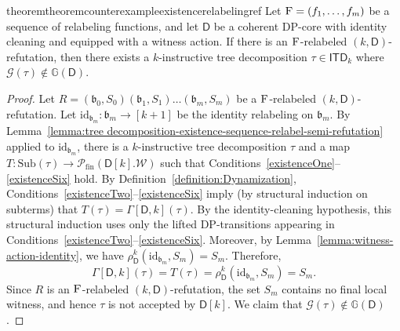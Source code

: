 \documentclass[11pt,a4paper]{article}
\newcommand{\treewidthvalue}{k}
\newcommand{\decompositiongraph}[1]{\mathcal{G}(#1)}
\newcommand{\abag}{\mathfrak{b}}
\newcommand{\allsubterms}{\mathrm{Sub}}
\newcommand{\allabstractdecompositionstreewidth}[1]{\mathsf{ITD}_{#1}}
\newcommand{\abstractdecomposition}{\tau}
\newcommand{\allwitnesses}{\mathcal{W}}
\newcommand{\finitepowerset}[1]{\mathcal{P}_{\mathrm{fin}}(#1)}
\newcommand{\dpcoregraphproperty}[1]{\mathbb{G}(#1)}
\newcommand{\dpcore}{\mathsf{D}}
\newcommand{\witnessset}{S}
\newcommand{\dynamizationfunctionname}[1]{\Gamma[{#1}]}
\newcommand{\dynamizationfunction}[2]{\dynamizationfunctionname{#1,#2}}
\newcommand{\dprefutation}{R}
\newcommand{\subtermToBag}{T}
\newcommand{\relabelingfunction}{f}
\newcommand{\action}{\rho}
\newcommand{\relabelsequence}{\textsc{F}}
\begin{document}
\begin{restatable}{theorem}{theoremcounterexampleexistencerelabelingref}\label{theorem:counterexample-existence-relabel-refutation}
Let $\relabelsequence=(\relabelingfunction_1,\dots,\relabelingfunction_m)$ be a sequence of relabeling functions, and let $\dpcore$ be a coherent DP-core with identity cleaning and equipped with a witness action. If there is an $\relabelsequence$-relabeled $(\treewidthvalue,\dpcore)$-refutation, then there exists a $\treewidthvalue$-instructive tree decomposition $\abstractdecomposition \in \allabstractdecompositionstreewidth{\treewidthvalue}$ where $\decompositiongraph{\abstractdecomposition}\notin \dpcoregraphproperty{\dpcore}$.
\end{restatable}
\begin{proof}
Let $\dprefutation= (\abag_0,\witnessset_0)(\abag_1,\witnessset_1)\dots (\abag_{m},\witnessset_m)$ be a $\relabelsequence$-relabeled $(\treewidthvalue,\dpcore)$-refutation.
Let $\mathrm{id}_{\abag_m}:\abag_m\to[\treewidthvalue+1]$ be the identity relabeling on $\abag_m$.
By Lemma~\ref{lemma:tree decomposition-existence-sequence-relabel-semi-refutation} applied to $\mathrm{id}_{\abag_m}$, there is a $\treewidthvalue$-instructive tree decomposition $\abstractdecomposition$ and a map
$\subtermToBag:\allsubterms(\abstractdecomposition) \to \finitepowerset{\dpcore[\treewidthvalue].\allwitnesses}$ such that Conditions~\ref{existenceOne}--\ref{existenceSix} hold. By Definition~\ref{definition:Dynamization}, Conditions~\ref{existenceTwo}--\ref{existenceSix} imply (by structural induction on subterms) that $\subtermToBag(\abstractdecomposition)=\dynamizationfunction{\dpcore}{\treewidthvalue}(\abstractdecomposition)$.
By the identity-cleaning hypothesis, this structural induction uses only the lifted DP-transitions appearing in Conditions~\ref{existenceTwo}--\ref{existenceSix}.
Moreover, by Lemma~\ref{lemma:witness-action-identity}, we have $\action_{\dpcore}^{\treewidthvalue}(\mathrm{id}_{\abag_m},\witnessset_m)=\witnessset_m$. Therefore,
\[
\dynamizationfunction{\dpcore}{\treewidthvalue}(\abstractdecomposition)
=\subtermToBag(\abstractdecomposition)
=\action_{\dpcore}^{\treewidthvalue}(\mathrm{id}_{\abag_m},\witnessset_m)
=\witnessset_m.
\]
	Since $\dprefutation$ is an $\relabelsequence$-relabeled $(\treewidthvalue,\dpcore)$-refutation, the set $\witnessset_m$ contains no final local witness, and hence $\abstractdecomposition$ is not accepted by $\dpcore[\treewidthvalue]$.
	We claim that $\decompositiongraph{\abstractdecomposition}\notin \dpcoregraphproperty{\dpcore}$.

\end{proof}
\end{document}

